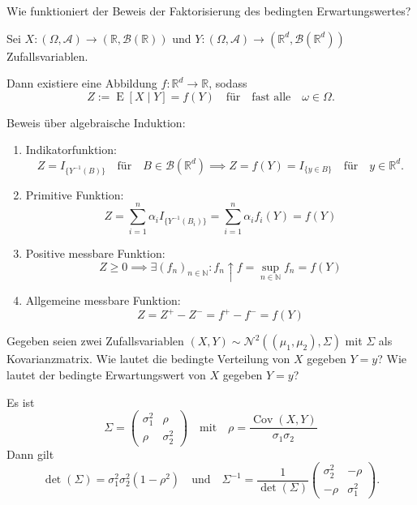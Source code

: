 \begin{QandA}
    \item Wie funktioniert der Beweis der Faktorisierung des bedingten Erwartungswertes?
    \begin{answered}
        Sei $X: (\Omega, \mathcal{A}) \to (\mathbb{R}, \mathcal{B}(\mathbb{R}))$ und $Y: (\Omega, \mathcal{A}) \to (\mathbb{R}^d, \mathcal{B}(\mathbb{R}^d))$ Zufallsvariablen.

        Dann existiere eine Abbildung $f: \mathbb{R}^d \to \mathbb{R}$, sodass
        \[
            Z := \operatorname{E}[X \mid Y] = f(Y) \quad \text{für} \quad \text{fast alle} \quad \omega \in \Omega.
        \]

        Beweis über algebraische Induktion:
        \begin{enumerate}
            \item Indikatorfunktion:
                  \[
                      Z = I_{\{Y^{-1}(B)\}} \quad \text{für} \quad B \in \mathcal{B}(\mathbb{R}^d) \implies Z = f(Y) = I_{\{y \in B\}} \quad \text{für} \quad y \in \mathbb{R}^d.
                  \]
            \item Primitive Funktion:
                  \[
                      Z = \sum_{i=1}^{n} \alpha_i I_{\{Y^{-1}(B_i)\}} = \sum_{i=1}^{n} \alpha_i f_i(Y) = f(Y)
                  \]
            \item Positive messbare Funktion:
                  \[
                      Z \geq 0 \implies \exists (f_n)_{n \in \mathbb{N}} : f_n \uparrow f = \sup_{n \in \mathbb{N}} f_n = f(Y)
                  \]
            \item Allgemeine messbare Funktion:
                  \[
                      Z = Z^+ - Z^- = f^+ - f^- = f(Y)
                  \]
        \end{enumerate}
    \end{answered}

    \item Gegeben seien zwei Zufallsvariablen $(X, Y) \sim \mathcal{N}^2((\mu_1, \mu_2), \Sigma)$ mit $\Sigma$ als Kovarianzmatrix.
    Wie lautet die bedingte Verteilung von $X$ gegeben $Y = y$?
    Wie lautet der bedingte Erwartungswert von $X$ gegeben $Y = y$?
    \begin{answered}
        Es ist
        \[
            \Sigma = \begin{pmatrix} \sigma_1^2 & \rho \\ \rho & \sigma_2^2 \end{pmatrix} \quad \text{mit} \quad \rho = \frac{\operatorname{Cov}(X, Y)}{\sigma_1 \sigma_2}
        \]
        Dann gilt
        \[
            \det(\Sigma) = \sigma_1^2 \sigma_2^2 (1 - \rho^2) \quad \text{und} \quad \Sigma^{-1} = \frac{1}{\det(\Sigma)} \begin{pmatrix} \sigma_2^2 & -\rho \\ -\rho & \sigma_1^2 \end{pmatrix}.
        \]


\end{answered}
\end{QandA}
